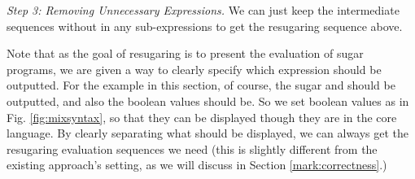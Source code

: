 {\em Step 3: Removing Unnecessary Expressions.}
We can just keep the intermediate sequences without  in any sub-expressions to get the resugaring sequence above.

Note that as the goal of resugaring is to present the evaluation of sugar programs, we are given a way to clearly specify which expression should be outputted. For the example in this section, of course, the sugar  and  should be outputted, and also the boolean values should be. So we set boolean values as  in Fig. \ref{fig:mixsyntax}, so that they can be displayed though they are in the core language. By clearly separating what should be displayed, we can always get the resugaring evaluation sequences we need (this is slightly different from the existing approach's setting, as we will discuss in Section \ref{mark:correctness}.)
